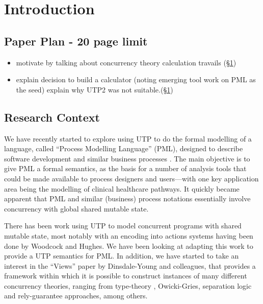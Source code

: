 \section{Introduction}\label{sec:Intro}


\subsection*{Paper Plan - 20 page limit}

\begin{itemize}
  \item motivate by talking about
  concurrency theory calculation travails (\S\ref{sec:Intro})
  \item explain decision to build a calculator
   (noting emerging tool work on PML as the seed)
   explain why UTP2 was not suitable.(\S\ref{sec:Intro})
\end{itemize}


\subsection{Research Context}\label{ssec:context}

We have recently started to explore using UTP
to do the  formal modelling of a language,
called ``Process Modelling Language'' (PML),
designed to describe software development and similar business
processes \cite{DBLP:journals/infsof/AtkinsonWN07}.
The main objective is to give PML a formal semantics,
as the basis for a number of analysis tools that could be made available
to process designers and users---with one key application
area being the modelling of clinical healthcare pathways.
It quickly became apparent that PML and similar (business) process
notations essentially involve concurrency with global shared mutable state.

There has been work using UTP
to model concurrent programs with shared mutable state,
most notably
with an encoding into actions systems having been done by
Woodcock and Hughes\cite{DBLP:conf/icfem/WoodcockH02}.
We have been looking at adapting this work to provide a UTP semantics
for PML.
In addition, we have started to take an interest in the ``Views'' paper
by Dinsdale-Young and colleagues\cite{conf/popl/Dinsdale-YoungBGPY13},
that provides a framework within which it is possible
to construct instances of many different concurrency theories,
ranging from
type-theory \cite{tal-toplas,Smit00b,journals/fuin/AhmedFM07},
Owicki-Gries\cite{Owicki76},
separation logic\cite{conf/lics/CalcagnoOY07}
and rely-guarantee\cite{Jones83}
approaches,
among others.


